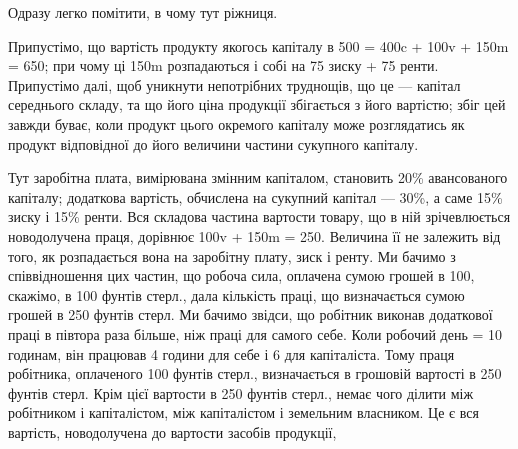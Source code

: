 Одразу легко помітити, в чому тут ріжниця.

Припустімо, що вартість продукту якогось капіталу в 500 = 400c +
100v + 150m = 650; при чому ці 150m розпадаються і собі на 75 зиску +
75 ренти. Припустімо далі, щоб уникнути непотрібних труднощів, що це —
капітал середнього складу, та що його ціна продукції збігається з його вартістю;
збіг цей завжди буває, коли продукт цього окремого капіталу може розглядатись
як продукт відповідної до його величини частини сукупного капіталу.

Тут заробітна плата, вимірювана змінним капіталом, становить 20\% авансованого
капіталу; додаткова вартість, обчислена на сукупний капітал — 30\%,
а саме 15\% зиску і 15\% ренти. Вся складова частина вартости товару, що
в ній зрічевлюється новодолучена праця, дорівнює 100v + 150m = 250. Величина
її не залежить від того, як розпадається вона на заробітну плату, зиск і ренту.
Ми бачимо з співвідношення цих частин, що робоча сила, оплачена сумою
грошей в 100, скажімо, в 100 фунтів стерл., дала кількість праці, що визначається
сумою грошей в 250 фунтів стерл. Ми бачимо звідси, що робітник
виконав додаткової праці в півтора раза більше, ніж праці для самого себе.
Коли робочий день = 10 годинам, він працював 4 години для себе і 6 для
капіталіста. Тому праця робітника, оплаченого 100 фунтів стерл., визначається
в грошовій вартості в 250 фунтів стерл. Крім цієї вартости в 250 фунтів стерл.,
немає чого ділити між робітником і капіталістом, між капіталістом і земельним
власником. Це є вся вартість, новодолучена до вартости засобів продукції,
\parbreak{}  %
